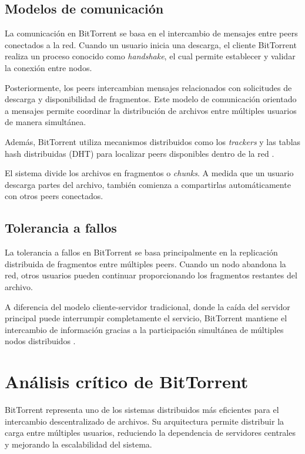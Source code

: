 \documentclass[12pt]{article}
\begin{document}
\subsection{Modelos de comunicación}

La comunicación en BitTorrent se basa en el intercambio de mensajes entre peers conectados a la red. Cuando un usuario inicia una descarga, el cliente BitTorrent realiza un proceso conocido como \textit{handshake}, el cual permite establecer y validar la conexión entre nodos.

Posteriormente, los peers intercambian mensajes relacionados con solicitudes de descarga y disponibilidad de fragmentos. Este modelo de comunicación orientado a mensajes permite coordinar la distribución de archivos entre múltiples usuarios de manera simultánea.

Además, BitTorrent utiliza mecanismos distribuidos como los \textit{trackers} y las tablas hash distribuidas (DHT) para localizar peers disponibles dentro de la red \cite{ref2}.

El sistema divide los archivos en fragmentos o \textit{chunks}. A medida que un usuario descarga partes del archivo, también comienza a compartirlas automáticamente con otros peers conectados.

\subsection{Tolerancia a fallos}

La tolerancia a fallos en BitTorrent se basa principalmente en la replicación distribuida de fragmentos entre múltiples peers. Cuando un nodo abandona la red, otros usuarios pueden continuar proporcionando los fragmentos restantes del archivo.

A diferencia del modelo cliente-servidor tradicional, donde la caída del servidor principal puede interrumpir completamente el servicio, BitTorrent mantiene el intercambio de información gracias a la participación simultánea de múltiples nodos distribuidos \cite{ref3}.

\section{Análisis crítico de BitTorrent}

BitTorrent representa uno de los sistemas distribuidos más eficientes para el intercambio descentralizado de archivos. Su arquitectura permite distribuir la carga entre múltiples usuarios, reduciendo la dependencia de servidores centrales y mejorando la escalabilidad del sistema.
\end{document}
